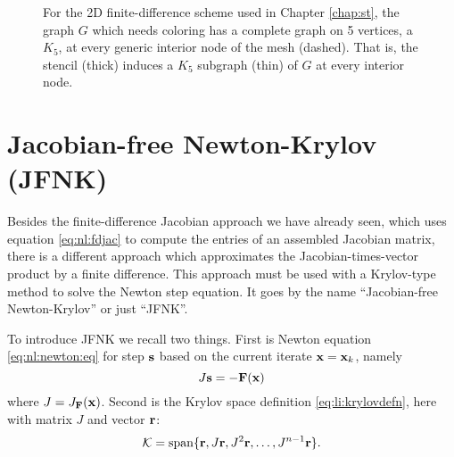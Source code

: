 \begin{figure}
\caption{For the 2D finite-difference scheme used in Chapter \ref{chap:st}, the graph $G$ which needs coloring has a complete graph on 5 vertices, a $K_5$, at every generic interior node of the mesh (dashed).  That is, the stencil (thick) induces a $K_5$ subgraph (thin) of $G$ at every interior node.}
\label{fig:colorstencilplane}
\end{figure}


\section{Jacobian-free Newton-Krylov (JFNK)} \label{sec:JFNK}

Besides the finite-difference Jacobian approach we have already seen, which uses equation \eqref{eq:nl:fdjac} to compute the entries of an assembled Jacobian matrix, there is a different approach which approximates the Jacobian-times-vector product by a finite difference.  This approach must be used with a Krylov-type method to solve the Newton step equation.  It goes by the name ``Jacobian-free Newton-Krylov'' \citep{KnollKeyes2004} or just ``JFNK''.

To introduce JFNK we recall two things.  First is Newton equation \eqref{eq:nl:newton:eq} for step $\mathbf{s}$ based on the current iterate $\mathbf{x}=\mathbf{x}_k$, namely
\begin{equation}
    J \mathbf{s} = - \mathbf{F}(\mathbf{x}) \label{eq:nl:newtoneqforJFNK}
\end{equation}
where $J = J_{\mathbf{F}}(\mathbf{x})$.  Second is the Krylov space definition \eqref{eq:li:krylovdefn}, here with matrix $J$ and vector $\mathbf{r}$:
\begin{equation}
    \mathcal{K} = \operatorname{span}\{\mathbf{r},J\mathbf{r},J^2\mathbf{r},\dots,J^{n-1}\mathbf{r}\}.  \label{eq:nl:krylovagain}
\end{equation}

